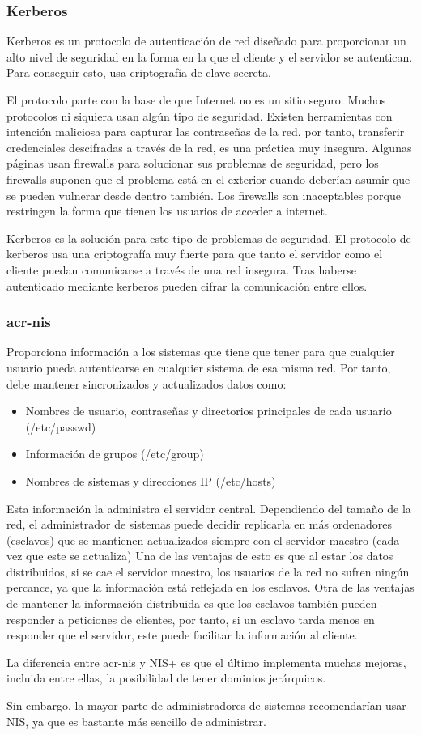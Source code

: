 \documentclass[twoside, titlepage, 12pt, a4paper]{article}
\begin{document}
\subsubsection{Kerberos}
Kerberos es un protocolo de autenticación de red diseñado para proporcionar un alto nivel de seguridad en la forma en la que el cliente y el servidor se autentican. Para conseguir esto, usa criptografía de clave secreta.\cite{mit-kerberos}\par El protocolo parte con la base de que Internet no es un sitio seguro. Muchos protocolos ni siquiera usan algún tipo de seguridad. Existen herramientas con intención maliciosa para capturar las contraseñas de la red, por tanto, transferir credenciales descifradas a través de la red, es una práctica muy insegura. Algunas páginas usan \gls{firewalls} para solucionar sus problemas de seguridad, pero los \gls{firewalls} suponen que el problema está en el exterior cuando deberían asumir que se pueden vulnerar desde dentro también. Los \gls{firewalls} son inaceptables porque restringen la forma que tienen los usuarios de acceder a internet.\par Kerberos es la solución para este tipo de problemas de seguridad. El protocolo de \gls{kerberos} usa una criptografía muy fuerte para que tanto el servidor como el cliente puedan comunicarse a través de una red insegura. Tras haberse autenticado mediante \gls{kerberos} pueden cifrar la comunicación entre ellos.
\subsubsection{\gls{acr-nis}}
Proporciona información a los sistemas que tiene que tener para que cualquier usuario pueda autenticarse en cualquier sistema de esa misma red. Por tanto, debe mantener sincronizados y actualizados datos como:
\begin{itemize}
	\item Nombres de usuario, contraseñas y directorios principales de cada usuario (/etc/passwd)
	\item Información de grupos (/etc/group)
	\item Nombres de sistemas y direcciones IP (/etc/hosts)
\end{itemize}
Esta información la administra el servidor central. Dependiendo del tamaño de la red, el administrador de sistemas puede decidir replicarla en más ordenadores (esclavos) que se mantienen actualizados siempre con el servidor maestro (cada vez que este se actualiza) Una de las ventajas de esto es que al estar los datos distribuidos, si se cae el servidor maestro, los usuarios de la red no sufren ningún percance, ya que la información está reflejada en los esclavos. Otra de las ventajas de mantener la información distribuida es que los esclavos también pueden responder a peticiones de clientes, por tanto, si un esclavo tarda menos en responder que el servidor, este puede facilitar la información al cliente.\par La diferencia entre \gls{acr-nis} y NIS+ es que el último implementa muchas mejoras, incluida entre ellas, la posibilidad de tener dominios jerárquicos.\par Sin embargo, la mayor parte de administradores de sistemas recomendarían usar NIS, ya que es bastante más sencillo de administrar.
\end{document}

